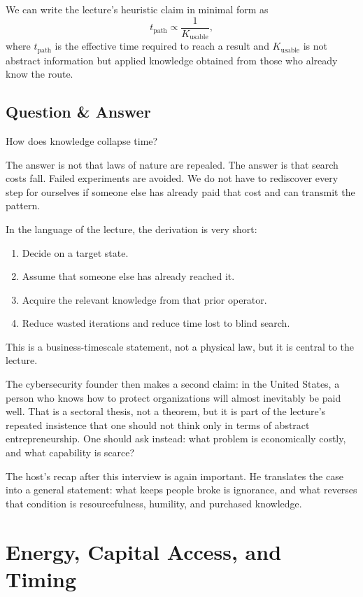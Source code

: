 We can write the lecture's heuristic claim in minimal form as
\begin{equation}
t_{\text{path}} \propto \frac{1}{K_{\text{usable}}},
\end{equation}
where \(t_{\text{path}}\) is the effective time required to reach a result and \(K_{\text{usable}}\) is not abstract information but applied knowledge obtained from those who already know the route.

\subsection{Question \& Answer}

How does knowledge collapse time?

The answer is not that laws of nature are repealed. The answer is that search costs fall. Failed experiments are avoided. We do not have to rediscover every step for ourselves if someone else has already paid that cost and can transmit the pattern.

In the language of the lecture, the derivation is very short:
\begin{enumerate}
\item Decide on a target state.
\item Assume that someone else has already reached it.
\item Acquire the relevant knowledge from that prior operator.
\item Reduce wasted iterations and reduce time lost to blind search.
\end{enumerate}
This is a business-timescale statement, not a physical law, but it is central to the lecture.

The cybersecurity founder then makes a second claim: in the United States, a person who knows how to protect organizations will almost inevitably be paid well. That is a sectoral thesis, not a theorem, but it is part of the lecture's repeated insistence that one should not think only in terms of abstract entrepreneurship. One should ask instead: what problem is economically costly, and what capability is scarce?

The host's recap after this interview is again important. He translates the case into a general statement: what keeps people broke is ignorance, and what reverses that condition is resourcefulness, humility, and purchased knowledge.

\section{Energy, Capital Access, and Timing}

